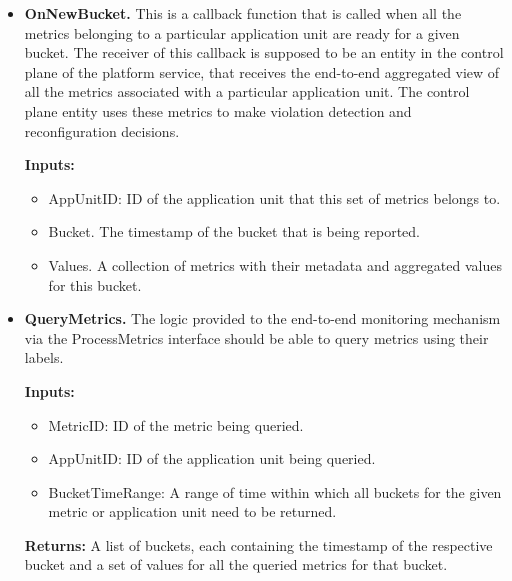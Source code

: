 \begin{itemize}
\item \textbf{OnNewBucket.} This is a callback function that is called when all the metrics belonging to a particular application unit are ready for a given bucket. The receiver of this callback is supposed to be an entity in the control plane of the platform service, that receives the end-to-end aggregated view of all the metrics associated with a particular application unit. The control plane entity uses these metrics to make violation detection and reconfiguration decisions.
\par \noindent \textbf{Inputs:}
\begin{itemize}
\item AppUnitID: ID of the application unit that this set of metrics belongs to.
\item Bucket. The timestamp of the bucket that is being reported.
\item Values. A collection of metrics with their metadata and aggregated values for this bucket.
\end{itemize}
\item \textbf{QueryMetrics. }The logic provided to the end-to-end monitoring mechanism via the ProcessMetrics interface should be able to query metrics using their labels. 
\par \noindent \textbf{Inputs:}
\begin{itemize}
\item MetricID: ID of the metric being queried.
\item AppUnitID: ID of the application unit being queried.
\item BucketTimeRange: A range of time within which all buckets for the given metric or application unit need to be returned.
\end{itemize}
\par \noindent \textbf{Returns:} A list of buckets, each containing the timestamp of the respective bucket and a set of values for all the queried metrics for that bucket.

\end{itemize}

